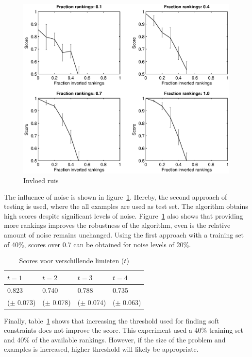 \documentclass{llncs}
\begin{document}
\begin{figure}

  \centering
    \includegraphics[width=1\linewidth]{noise}
  \caption{Invloed ruis}
  \label{fig:ruis}

\end{figure}

The influence of noise is shown in figure~\ref{fig:ruis}.
Hereby, the second approach of testing is used, where the all examples are used as test set.
The algorithm obtains high scores despite significant levels of noise.
Figure~\ref{fig:ruis} also shows that providing more rankings improves the robustness of the algorithm, even is the relative amount of noise remains unchanged.
Using the first approach with a training set of 40\%, scores over 0.7 can be obtained for noise levels of 20\%.

  \begin{table}
    \caption{Scores voor verschillende limieten ($t$)}
    \begin{tabularx}{\linewidth}{XXXX}
      $t = 1$ & $t = 2$ & $t = 3$ & $t = 4$ \\
      \toprule
     0.823 & 0.740 & 0.788 & 0.735 \\
     ($\pm$ 0.073)&
($\pm$ 0.078)&
($\pm$ 0.074)&
($\pm$ 0.063)
    \end{tabularx}
    \label{tbl:limiet}
  \end{table}

Finally, table~\ref{tbl:limiet} shows that increasing the threshold used for finding soft constraints does not improve the score.
This experiment used a 40\% training set and 40\% of the available rankings.
However, if the size of the problem and examples is increased, higher threshold will likely be appropriate.
\end{document}
